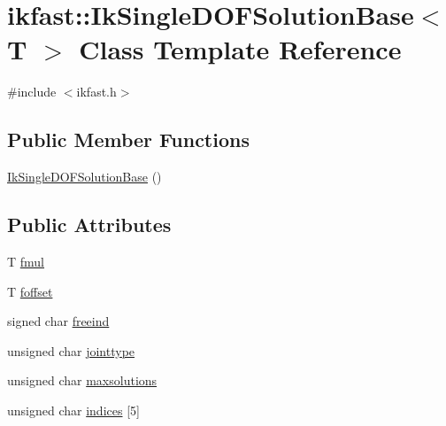 \hypertarget{classikfast_1_1IkSingleDOFSolutionBase}{\section{ikfast\-:\-:Ik\-Single\-D\-O\-F\-Solution\-Base$<$ T $>$ Class Template Reference}
\label{classikfast_1_1IkSingleDOFSolutionBase}
}


{\ttfamily \#include $<$ikfast.\-h$>$}

\subsection*{Public Member Functions}
\begin{DoxyCompactItemize}
\item 
\hyperlink{classikfast_1_1IkSingleDOFSolutionBase_aa3c37c6e9a4903f1303893e966260789}{Ik\-Single\-D\-O\-F\-Solution\-Base} ()
\end{DoxyCompactItemize}
\subsection*{Public Attributes}
\begin{DoxyCompactItemize}
\item 
T \hyperlink{classikfast_1_1IkSingleDOFSolutionBase_adb64a33a2ce7357684c9c89d75cacd0c}{fmul}
\item 
T \hyperlink{classikfast_1_1IkSingleDOFSolutionBase_a1d5900ae9cb2d55c396b995b976fdcef}{foffset}
\item 
signed char \hyperlink{classikfast_1_1IkSingleDOFSolutionBase_adca245b0afa4133dddbd10803053bc2a}{freeind}
\item 
unsigned char \hyperlink{classikfast_1_1IkSingleDOFSolutionBase_a3c458c4a2b06b4a2ccffc265cf34c6fe}{jointtype}
\item 
unsigned char \hyperlink{classikfast_1_1IkSingleDOFSolutionBase_a45404bf30c7b90131b7ce2b8045c6f6a}{maxsolutions}
\item 
unsigned char \hyperlink{classikfast_1_1IkSingleDOFSolutionBase_a50d8439b7f735a474f6dfe42e91de455}{indices} \mbox{[}5\mbox{]}
\end{DoxyCompactItemize}


